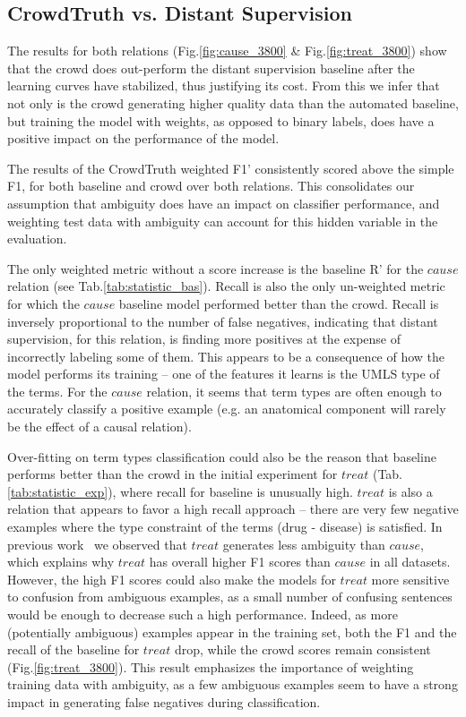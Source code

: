 \subsection{CrowdTruth vs. Distant Supervision}

The results for both relations (Fig.\ref{fig:cause_3800} \& Fig.\ref{fig:treat_3800}) show that the crowd does out-perform the distant supervision baseline after the learning curves have stabilized, thus justifying its cost. From this we infer that not only is the crowd generating higher quality data than the automated baseline, but training the model with weights, as opposed to binary labels, does have a positive impact on the performance of the model.

The results of the CrowdTruth weighted F1' consistently scored above the simple F1, for both baseline and crowd over both relations.  This consolidates our assumption that ambiguity does have an impact on classifier performance, and weighting test data with ambiguity can account for this hidden variable in the evaluation.

The only weighted metric without a score increase is the baseline R' for the $cause$ relation (see Tab.\ref{tab:statistic_bas}). Recall is also the only un-weighted metric for which the $cause$ baseline model performed better than the crowd. Recall is inversely proportional to the number of false negatives, indicating that distant supervision, for this relation, is finding more positives at the expense of incorrectly labeling some of them.  This appears to be a consequence of how the model performs its training -- one of the features it learns is the UMLS type of the terms. For the $cause$ relation, it seems that term types are often enough to accurately classify a positive example (e.g. an anatomical component will rarely be the effect of a causal relation).

Over-fitting on term types classification could also be the reason that baseline performs better than the crowd in the initial experiment for $treat$ (Tab.\ref{tab:statistic_exp}), where recall for baseline is unusually high. $treat$ is also a relation that appears to favor a high recall approach -- there are very few negative examples where the type constraint of the terms (drug - disease) is satisfied. In previous work~\cite{aroyo2014threesides} we observed that $treat$ generates less ambiguity than $cause$, which explains why $treat$ has overall higher F1 scores than $cause$ in all datasets. However, the high F1 scores could also make the models for $treat$ more sensitive to confusion from ambiguous examples, as a small number of confusing sentences would be enough to decrease such a high performance. Indeed, as more (potentially ambiguous) examples appear in the training set, both the F1 and the recall of the baseline for $treat$ drop, while the crowd scores remain consistent (Fig.\ref{fig:treat_3800}). This result emphasizes the importance of weighting training data with ambiguity, as a few ambiguous examples seem to have a strong impact in generating false negatives during classification.

